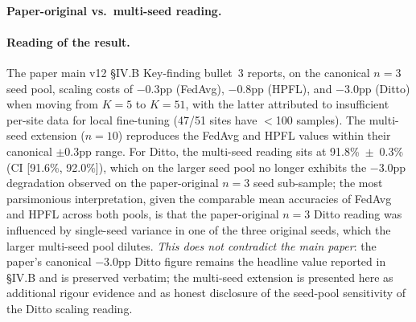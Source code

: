 \documentclass[conference]{IEEEtran}
\begin{document}
\paragraph{Paper-original vs.\ multi-seed reading.}

\begin{table}[ht]
\centering
\caption{Anchor: paper main v12 §IV.B Key-finding bullet~3 (canonical) vs.\ post-submission multi-seed reading. The paper-original $n{=}3$ values are the canonical claim of the main paper and remain the headline numbers; the multi-seed $n{=}10$ values are presented as complementary rigour evidence.}
\label{tab:s-prerebuttal-8-paper-vs-multi-anchor}
\small
{}
\end{table}

\paragraph{Reading of the result.} The paper main v12 §IV.B Key-finding bullet~3 reports, on the canonical $n{=}3$ seed pool, scaling costs of $-$0.3pp (FedAvg), $-$0.8pp (HPFL), and $-$3.0pp (Ditto) when moving from $K{=}5$ to $K{=}51$, with the latter attributed to insufficient per-site data for local fine-tuning (47/51 sites have $<$100 samples). The multi-seed extension ($n{=}10$) reproduces the FedAvg and HPFL values within their canonical $\pm$0.3pp range. For Ditto, the multi-seed reading sits at 91.8\%~$\pm$~0.3\% (CI [91.6\%, 92.0\%]), which on the larger seed pool no longer exhibits the $-$3.0pp degradation observed on the paper-original $n{=}3$ seed sub-sample; the most parsimonious interpretation, given the comparable mean accuracies of FedAvg and HPFL across both pools, is that the paper-original $n{=}3$ Ditto reading was influenced by single-seed variance in one of the three original seeds, which the larger multi-seed pool dilutes. \emph{This does not contradict the main paper}: the paper's canonical $-$3.0pp Ditto figure remains the headline value reported in §IV.B and is preserved verbatim; the multi-seed extension is presented here as additional rigour evidence and as honest disclosure of the seed-pool sensitivity of the Ditto scaling reading.
\end{document}
